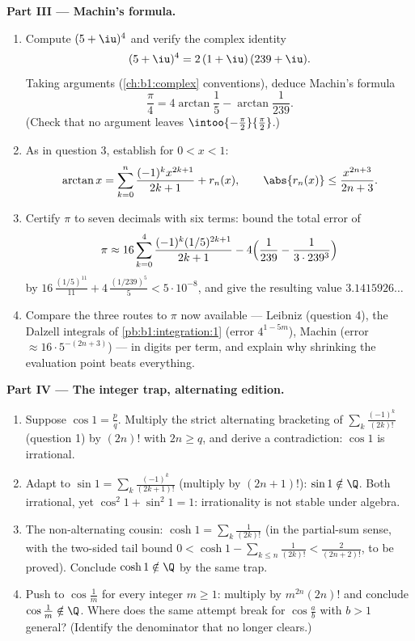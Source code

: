 \begin{problem}
\medskip
\noindent\textbf{Part III --- Machin's formula.}
\begin{enumerate}[resume]
  \item Compute $(5 + \iu)^4$ and verify the complex identity
        \[
        (5 + \iu)^4 = 2\,(1 + \iu)\,(239 + \iu) .
        \]
        Taking arguments (\cref{ch:b1:complex} conventions),
        deduce Machin's formula
        \[
        \frac\pi4 = 4\arctan\frac15 - \arctan\frac{1}{239} .
        \]
        (Check that no argument leaves
        $\intoo{-\frac\pi2}{\frac\pi2}$.)
  \item As in question 3, establish for $0 < x < 1$:
        \[
        \arctan x = \sum_{k=0}^{n} \frac{(-1)^k
        x^{2k+1}}{2k+1} + r_n(x), \qquad \abs{r_n(x)} \leq
        \frac{x^{2n+3}}{2n+3} .
        \]
  \item Certify $\pi$ to seven decimals with six terms: bound
        the total error of
        \[
        \pi \approx 16\sum_{k=0}^{4}
        \frac{(-1)^k (1/5)^{2k+1}}{2k+1}
        - 4\Bigl(\frac{1}{239} - \frac{1}{3\cdot239^3}\Bigr)
        \]
        by $16\,\frac{(1/5)^{11}}{11} +
        4\,\frac{(1/239)^5}{5} < 5\cdot10^{-8}$, and give the
        resulting value $3.1415926\dots$
  \item Compare the three routes to $\pi$ now available ---
        Leibniz (question 4), the Dalzell integrals of
        \cref{pb:b1:integration:1} (error $4^{1-5m}$), Machin
        (error $\approx 16\cdot 5^{-(2n+3)}$) --- in digits per
        term, and explain why shrinking the evaluation point
        beats everything.
\end{enumerate}

\medskip
\noindent\textbf{Part IV --- The integer trap, alternating
edition.}
\begin{enumerate}[resume]
  \item Suppose $\cos 1 = \frac pq$. Multiply the strict
        alternating bracketing of $\sum_{k}
        \frac{(-1)^k}{(2k)!}$ (question 1) by $(2n)!$ with $2n
        \geq q$, and derive a contradiction: $\cos 1$ is
        irrational.
  \item Adapt to $\sin 1 = \sum_k \frac{(-1)^k}{(2k+1)!}$
        (multiply by $(2n+1)!$): $\sin 1 \notin \Q$. Both
        irrational, yet $\cos^2 1 + \sin^2 1 = 1$: irrationality
        is not stable under algebra.
  \item The non-alternating cousin: $\cosh 1 = \sum_k
        \frac{1}{(2k)!}$ (in the partial-sum sense, with the
        two-sided tail bound $0 < \cosh 1 - \sum_{k \leq n}
        \frac{1}{(2k)!} < \frac{2}{(2n+2)!}$, to be proved).
        Conclude $\cosh 1 \notin \Q$ by the same trap.
  \item Push to $\cos\frac 1m$ for every integer $m \geq 1$:
        multiply by $m^{2n}(2n)!$ and conclude $\cos\frac1m
        \notin \Q$. Where does the same attempt break for
        $\cos\frac ab$ with $b > 1$ general? (Identify the
        denominator that no longer clears.)
\end{enumerate}


\end{problem}
